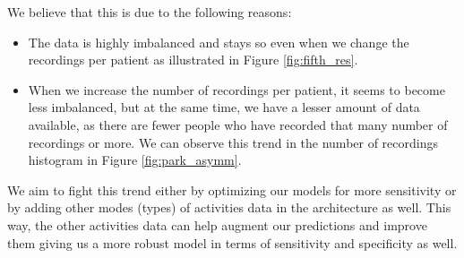 We believe that this is due to the following reasons:
\begin{itemize}
\item The data is highly imbalanced and stays so even when we change the recordings per patient as illustrated in Figure \ref{fig:fifth_res}. 
\item When we increase the number of recordings per patient, it seems to become less imbalanced, but at the same time, we have a lesser amount of data available, as there are fewer people who have recorded that many number of recordings or more. We can observe this trend in the number of recordings histogram in Figure \ref{fig:park_asymm}.
\end{itemize}
We aim to fight this trend either by optimizing our models for more sensitivity or by adding other modes (types) of activities data in the architecture as well. This way, the other activities data can help augment our predictions and improve them giving us a more robust model in terms of sensitivity and specificity as well.